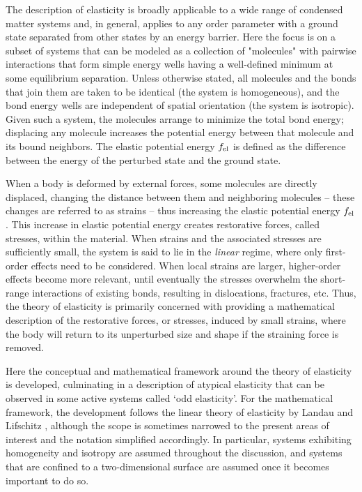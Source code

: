 The description of elasticity is broadly applicable to a wide range of condensed matter systems and, in general, applies to any order parameter with a ground state separated from other states by an energy barrier. Here the focus is on a subset of systems that can be modeled as a collection of "molecules" with pairwise interactions that form simple energy wells having a well-defined minimum at some equilibrium separation. Unless otherwise stated, all molecules and the bonds that join them are taken to be identical (the system is homogeneous), and the bond energy wells are independent of spatial orientation (the system is isotropic). Given such a system, the molecules arrange to minimize the total bond energy; displacing any molecule increases the potential energy between that molecule and its bound neighbors. The elastic potential energy $f_{\text{el}}$ is defined as the difference between the energy of the perturbed state and the ground state.

When a body is deformed by external forces, some molecules are directly displaced, changing the distance between them and neighboring molecules -- these changes are referred to as strains -- thus increasing the elastic potential energy $f_{\text{el}}$.  This increase in elastic potential energy creates restorative forces, called stresses, within the material.  When strains and the associated stresses are sufficiently small, the system is said to lie in the \textit{linear} regime, where only first-order effects need to be considered.  When local strains are larger, higher-order effects become more relevant, until eventually the stresses overwhelm the short-range interactions of existing bonds, resulting in dislocations, fractures, etc.  Thus, the theory of elasticity is primarily concerned with providing a mathematical description of the restorative forces, or stresses, induced by small strains, where the body will return to its unperturbed size and shape if the straining force is removed.

Here the conceptual and mathematical framework around the theory of elasticity is developed, culminating in a description of atypical elasticity that can be observed in some active systems called `odd elasticity'.  For the mathematical framework, the development follows the linear theory of elasticity by Landau and Lifschitz \cite{landau2012theory}, although the scope is sometimes narrowed to the present areas of interest and the notation simplified accordingly.  In particular, systems exhibiting homogeneity and isotropy are assumed throughout the discussion, and systems that are confined to a two-dimensional surface are assumed once it becomes important to do so.

